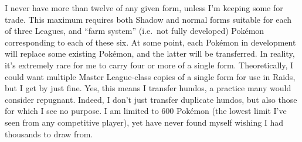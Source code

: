 I never have more than twelve of any given form, unless I'm keeping some for trade.
This maximum requires both Shadow and normal forms suitable for each of three Leagues,
 and ``farm system'' (i.e.\ not fully developed) Pokémon corresponding to each of these six.
At some point, each Pokémon in development will replace some existing Pokémon, and the
 latter will be transferred.
In reality, it's extremely rare for me to carry four or more of a single form.
Theoretically, I could want multiple Master League-class copies of a single form for
 use in Raids, but I get by just fine.
Yes, this means I transfer hundos, a practice many would consider repugnant.
Indeed, I don't just transfer duplicate hundos, but also those for which I see no purpose.
I am limited to 600 Pokémon (the lowest limit I've seen from any competitive player),
 yet have never found myself wishing I had thousands to draw from.
